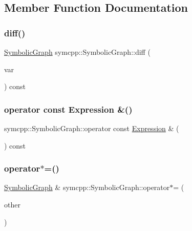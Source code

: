 \subsection{Member Function Documentation}
\mbox{\label{classsymcpp_1_1SymbolicGraph_a6f2f531206034592759502fe2bf6537f}} 
\subsubsection{\texorpdfstring{diff()}{diff()}}
{\footnotesize\ttfamily \mbox{\hyperlink{classsymcpp_1_1SymbolicGraph}{Symbolic\+Graph}} symcpp\+::\+Symbolic\+Graph\+::diff (\begin{DoxyParamCaption}\item[{std\+::string}]{var }\end{DoxyParamCaption}) const}

\mbox{\label{classsymcpp_1_1SymbolicGraph_a77b9c5dd5ebc737b6a60aa49996b37b3}} 
\subsubsection{\texorpdfstring{operator const Expression \&()}{operator const Expression \&()}}
{\footnotesize\ttfamily symcpp\+::\+Symbolic\+Graph\+::operator const \mbox{\hyperlink{classsymcpp_1_1Expression}{Expression}} \& (\begin{DoxyParamCaption}{ }\end{DoxyParamCaption}) const\hspace{0.3cm}{\ttfamily [inline]}}

\mbox{\label{classsymcpp_1_1SymbolicGraph_ad3ba7327225f323e98a0db4a78434d18}} 
\subsubsection{\texorpdfstring{operator$\ast$=()}{operator*=()}}
{\footnotesize\ttfamily \mbox{\hyperlink{classsymcpp_1_1SymbolicGraph}{Symbolic\+Graph}} \& symcpp\+::\+Symbolic\+Graph\+::operator$\ast$= (\begin{DoxyParamCaption}\item[{const \mbox{\hyperlink{classsymcpp_1_1SymbolicGraph}{Symbolic\+Graph}} \&}]{other }\end{DoxyParamCaption})}

